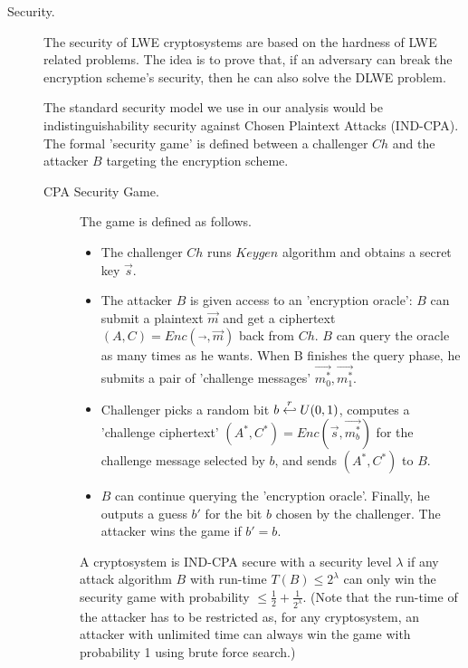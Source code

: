 \begin{description}
\item [Security.] The security of LWE cryptosystems are based on the hardness of LWE related problems. The idea is to prove that, if an adversary can break the encryption scheme's security, then he can also solve the DLWE problem.

  The standard security model we use in our analysis would be indistinguishability security against Chosen
  Plaintext Attacks (IND-CPA). The formal 'security game' is defined between a
  challenger $Ch$ and the attacker $B$ targeting the encryption scheme.

  \begin{description}
  \item[CPA Security Game.] The game is defined as follows.
    \begin{itemize}
    \item The challenger $Ch$ runs $Keygen$ algorithm and obtains a secret key
      $\vec{s}$.
    \item The attacker $B$ is given access to an 'encryption oracle': $B$ can
      submit a plaintext $\vec{m}$ and get a ciphertext
      $(A,C) = Enc(\vec{}, \vec{m})$ back from $Ch$. $B$ can query the oracle as many times as
      he wants. When B finishes the query phase, he submits a pair of
      'challenge messages' $\vec{m_0^*},\vec{m_1^*}$.
    \item Challenger picks a random bit $b \stackrel{r}{\hookleftarrow} U(0,1)$, computes a
      'challenge ciphertext' $(A^*, C^*) = Enc(\vec{s}, \vec{m_b^*})$ for the
      challenge message selected by $b$, and sends $(A^*, C^*)$ to $B$.
    \item $B$ can continue querying the 'encryption oracle'. Finally, he outputs a guess $b'$ for the bit $b$ chosen by the
      challenger. The attacker wins the game if $b' = b$.
    \end{itemize}
    \begin{definition}
       A cryptosystem is IND-CPA secure with a security level
      $\lambda$ if any attack algorithm $B$ with run-time $T(B) \leq 2^\lambda$
      can only win the security game with probability
      $\leq \frac{1}{2} + \frac{1}{2^\lambda}$.  (Note that the run-time of the attacker has to be restricted as, for any cryptosystem, an
      attacker with unlimited time can always win the game with probability 1
      using brute force search.)
      \label{def:IND-CPA Security}
    \end{definition}
    \end{description}


\end{description}

